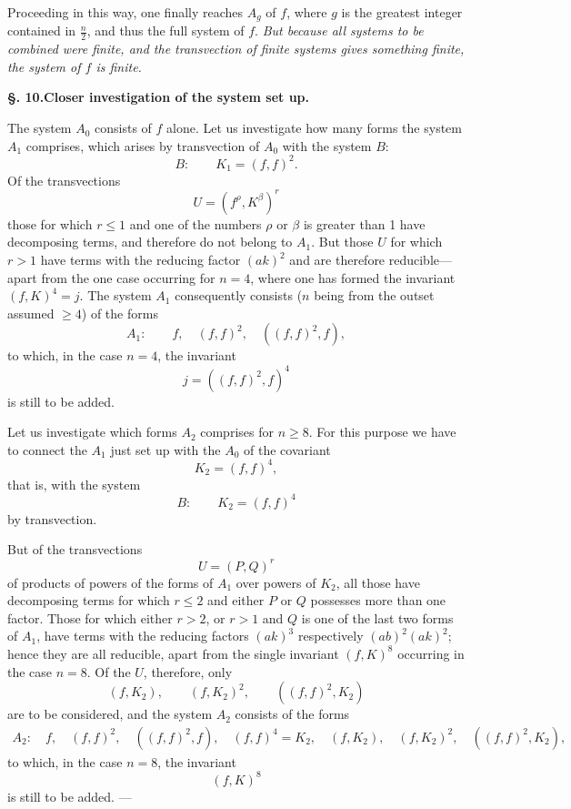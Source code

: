 \documentclass[10pt]{article}
\begin{document}
Proceeding in this way, one finally reaches $A_g$ of $f$, where $g$ is the greatest integer contained in $\frac n2$, and thus the full system of $f$. \textit{But because all systems to be combined were finite, and the transvection of finite systems gives something finite, the system of $f$ is finite.}

\begin{center}
{\bfseries §. 10.\quad Closer investigation of the system set up.}
\end{center}

The system $A_0$ consists of $f$ alone. Let us investigate how many forms the system $A_1$ comprises, which arises by transvection of $A_0$ with the system $B$:
\[
B:
\qquad K_1=(f,f)^2.
\]
Of the transvections
\[
U=(f^\rho,K^\beta)^r
\]
those for which $r\leq1$ and one of the numbers $\rho$ or $\beta$ is greater than 1 have decomposing terms, and therefore do not belong to $A_1$. But those $U$ for which $r>1$ have terms with the reducing factor $(ak)^2$ and are therefore reducible---apart from the one case occurring for $n=4$, where one has formed the invariant $(f,K)^4=j$. The system $A_1$ consequently consists ($n$ being from the outset assumed $\geq4$) of the forms
\[
A_1:
\qquad f,
\quad (f,f)^2,
\quad ((f,f)^2,f),
\]
to which, in the case $n=4$, the invariant
\[
j=((f,f)^2,f)^4
\]
is still to be added.

Let us investigate which forms $A_2$ comprises for $n\geq8$. For this purpose we have to connect the $A_1$ just set up with the $A_0$ of the covariant
\[
K_2=(f,f)^4,
\]
that is, with the system
\[
B:
\qquad K_2=(f,f)^4
\]
by transvection.

But of the transvections
\[
U=(P,Q)^r
\]
of products of powers of the forms of $A_1$ over powers of $K_2$, all those have decomposing terms for which $r\leq2$ and either $P$ or $Q$ possesses more than one factor. Those for which either $r>2$, or $r>1$ and $Q$ is one of the last two forms of $A_1$, have terms with the reducing factors $(ak)^3$ respectively $(ab)^2(ak)^2$; hence they are all reducible, apart from the single invariant $(f,K)^8$ occurring in the case $n=8$. Of the $U$, therefore, only
\[
(f,K_2),\qquad (f,K_2)^2,\qquad ((f,f)^2,K_2)
\]
are to be considered, and the system $A_2$ consists of the forms
\[
\begin{gathered}
A_2:
\quad f,
\quad (f,f)^2,
\quad ((f,f)^2,f),
\quad (f,f)^4=K_2,
\quad (f,K_2),\quad (f,K_2)^2,
\quad ((f,f)^2,K_2),
\end{gathered}
\]
to which, in the case $n=8$, the invariant
\[
(f,K)^8
\]
is still to be added. ---
\end{document}
